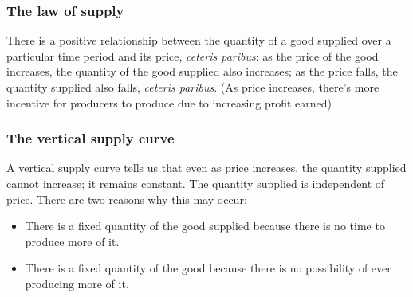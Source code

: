 \subsubsection*{The law of supply}
There is a positive relationship between the quantity of a good supplied over a particular time period and its price, \emph{ceteris paribus}: as the price of the good increases, the quantity of the good supplied also increases; as the price falls, the quantity supplied also falls, \emph{ceteris paribus}. (As price increases, there's more incentive for producers to produce due to increasing profit earned)
\subsubsection*{The vertical supply curve}
A vertical supply curve tells us that even as price increases, the quantity supplied cannot increase; it remains constant. The quantity supplied is independent of price. There are two reasons why this may occur:
\begin{itemize}
  \item There is a fixed quantity of the good supplied because there is no time to produce more of it.
  \item There is a fixed quantity of the good because there is no possibility of ever producing more of it. 
\end{itemize}

